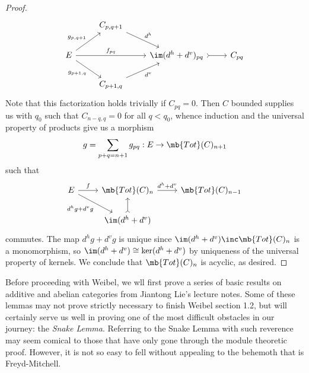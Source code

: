 \documentclass[12pt]{amsart}
\newcommand{\Tot}{\mb{Tot}}
\theoremstyle{definition}
\begin{document}
\begin{proof}
\[\begin{tikzcd}
      &C_{p,q+1}\ar[dr,"d^h"]\\
      E\ar[rr,"f_{pq}"]\ar[ur,"g_{p,q+1}"]\ar[dr,"g_{p+1,q}"']&&\im(d^h+d^v)_{pq}\ar[r,tail]&C_{pq}\\
      &C_{p+1,q}\ar[ur,"d^v"']
    \end{tikzcd}
  \] 
  Note that this factorization holds trivially if $C_{pq}=0$.
  Then $C$ bounded supplies us with $q_0$ such that $C_{n-q,q}=0$ for all $q<q_0$, whence induction and the universal property of products give us a morphism
  \[
    g=\sum_{p+q=n+1}g_{pq}:E\to \Tot(C)_{n+1}
  \]
  such that
  \[
    \begin{tikzcd}
      E\ar[dr,"d^hg+d^vg"']\ar[r,"f"]&\Tot(C)_n\ar[r,"d^h+d^v"]&\Tot(C)_{n-1}\\
      &\im(d^h+d^v)\ar[u,tail]
    \end{tikzcd}
  \] 
  commutes.
  The map $d^hg+d^vg$ is unique since $\im(d^h+d^v)\inc \Tot(C)_n$ is a monomorphism, so $\im(d^h+d^v)\cong \ker(d^h+d^v)$ by uniqueness of the universal property of kernels.
  We conclude that $\Tot(C)_n$ is acyclic, as desired.
\end{proof}

Before proceeding with Weibel, we wll first prove a series of basic results on additive and abelian categories from Jiantong Lie's lecture notes.
Some of these lemmas may not prove strictly necessary to finish Weibel section 1.2, but will certainly serve us well in proving one of the most difficult obstacles in our journey: the \textit{Snake Lemma}.
Referring to the Snake Lemma with such reverence may seem comical to those that have only gone through the module theoretic proof.
However, it is not so easy to fell without appealing to the behemoth that is Freyd-Mitchell.
\end{document}
